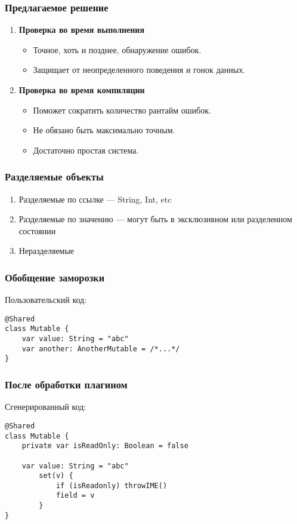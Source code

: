 \documentclass[14pt,xcolor={dvipsnames}]{beamer}
\begin{document}
\begin{frame}
\frametitle{Предлагаемое решение}
\begin{enumerate}
  \item \textbf{Проверка во время выполнения}
  \begin{itemize}
    \item Точное, хоть и позднее, обнаружение ошибок.
    \item Защищает от неопределенного поведения и гонок данных.
  \end{itemize}
  \item \textbf{Проверка во время компиляции}
  \begin{itemize}
    \item Поможет сократить количество рантайм ошибок.
    \item Не обязано быть максимально точным.
    \item Достаточно простая система.
  \end{itemize}
\end{enumerate}
\end{frame}

\begin{frame}
\frametitle{Разделяемые объекты}
\begin{enumerate}
	\item Разделяемые по ссылке --- String, Int, etc
	\item Разделяемые по значению --- могут быть в эксклюзивном или разделенном состоянии
	\item Неразделяемые
\end{enumerate}
\end{frame}

\begin{frame}[fragile]
\frametitle{Обобщение заморозки}
Пользовательский код:
\vspace{20pt}
\begin{lstlisting}[basicstyle=\small\ttfamily]
@Shared
class Mutable {
	var value: String = "abc"
	var another: AnotherMutable = /*...*/
}
\end{lstlisting}
\end{frame}

\begin{frame}[fragile]
\frametitle{После обработки плагином}
Сгенерированный код:
\begin{lstlisting}[basicstyle=\fontsize{10}{1}\selectfont\ttfamily]
@Shared
class Mutable {
	private var isReadOnly: Boolean = false
	
	var value: String = "abc"
		set(v) {
			if (isReadonly) throwIME() 
			field = v
		}
}
\end{lstlisting}
\end{frame}
\end{document}
